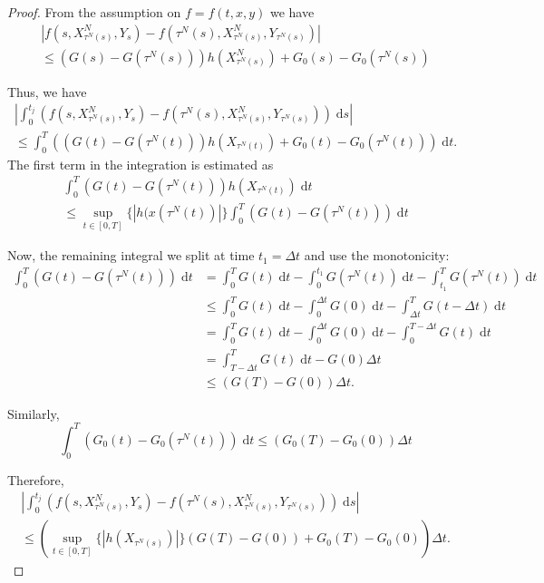 \documentclass[reqno,12pt]{amsart}
\theoremstyle{plain}%
\theoremstyle{definition}
\begin{document}
\begin{proof}
    From the assumption on $f=f(t, x, y)$ we have
    \begin{multline*}
        |f(s, X_{\tau^N(s)}^N, Y_s) - f(\tau^N(s), X_{\tau^N(s)}^N, Y_{\tau^N(s)})| \\ 
        \leq (G(s) - G(\tau^N(s)))h(X_{\tau^N(s)}^N) + G_0(s) - G_0(\tau^N(s))
    \end{multline*}
    
    Thus, we have
    \begin{multline*}
        \left|\int_0^{t_j} \left( f(s, X_{\tau^N(s)}^N, Y_s) - f(\tau^N(s), X_{\tau^N(s)}^N, Y_{\tau^N(s)}) \right)\;\mathrm{d}s\right| \\
         \leq \int_0^T \left((G(t) - G(\tau^N(t)))h(X_{\tau^N(t)}) + G_0(t) - G_0(\tau^N(t))\right)\;\mathrm{d}t.
    \end{multline*}
    The first term in the integration is estimated as
    \begin{multline*}
        \int_0^T (G(t) - G(\tau^N(t)))h(X_{\tau^N(t)})\;\mathrm{d}t \\
        \leq \sup_{t\in [0, T]}\{|h(x(\tau^N(t))|\} \int_0^T (G(t) - G(\tau^N(t)))\;\mathrm{d}t
    \end{multline*}

    Now, the remaining integral we split at time $t_1 = \Delta t$ and use the monotonicity:
    \begin{align*}
        \int_0^T (G(t) - G(\tau^N(t)))\;\mathrm{d}t & = \int_0^T G(t) \;\mathrm{d}t - \int_0^{t_1} G(\tau^N(t))\;\mathrm{d}t - \int_{t_1}^T G(\tau^N(t))\;\mathrm{d}t \\
        & \leq \int_0^T G(t) \;\mathrm{d}t - \int_0^{\Delta t} G(0)\;\mathrm{d}t - \int_{\Delta t}^T G(t-\Delta t)\;\mathrm{d}t \\
        & = \int_0^T G(t) \;\mathrm{d}t - \int_0^{\Delta t} G(0)\;\mathrm{d}t - \int_{0}^{T-\Delta t} G(t)\;\mathrm{d}t \\
        & = \int_{T-\Delta t}^T G(t) \;\mathrm{d}t - G(0)\Delta t \\
        & \leq (G(T) - G(0))\Delta t.
    \end{align*}

    Similarly,
    \[
        \int_0^T (G_0(t) - G_0(\tau^N(t)))\;\mathrm{d}t \leq (G_0(T) - G_0(0))\Delta t
    \]

    Therefore,
    \begin{multline*}
        \left|\int_0^{t_j} \left( f(s, X_{\tau^N(s)}^N, Y_s) - f(\tau^N(s), X_{\tau^N(s)}^N, Y_{\tau^N(s)}) \right)\;\mathrm{d}s\right| \\
         \leq \left(\sup_{t\in [0, T]}\{|h(X_{\tau^N(s)})|\}(G(T) - G(0)) + G_0(T) - G_0(0) \right)\Delta t. 
    \end{multline*}
\end{proof}
\end{document}
